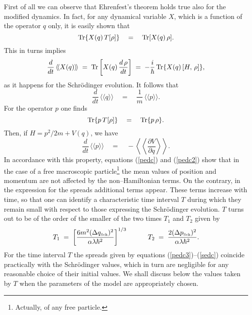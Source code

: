 \documentclass[12pt]{article}
\newcommand{\llangle}{\langle\!\langle}
\newcommand{\rrangle}{\rangle\!\rangle}
\newcommand{\LLangle}{\left\langle\!\!\!\left\langle}
\newcommand{\RRangle}{\right\rangle\!\!\!\right\rangle}
\begin{document}
First of all we can observe that Ehrenfest's theorem holds true
also for the modified dynamics. In fact, for any dynamical
variable $X$, which is a function of the operator $q$ only, it is
easily shown that
\begin{equation}
\makebox{Tr} \{ X(q)\,T[\rho]\} \quad = \quad \makebox{Tr}[X(q)\,
\rho].
\end{equation}
This in turns implies
\begin{equation}
\frac{d}{dt}\, \llangle X(q) \rrangle \; = \; \makebox{Tr} \left[
X(q)\, \frac{d\,\rho}{dt} \right] \; = \; - \frac{i}{\hbar} \,
\makebox{Tr} \{ X(q)\, [ H,\, \rho]\},
\end{equation}
as it happens for the Schr\"odinger evolution. It follows that
\begin{equation} \frac{d}{dt}\, \llangle q \rrangle \quad = \quad
\frac{1}{m}\, \llangle p \rrangle.
\end{equation}
For the operator $p$ one finds
\begin{equation}
\makebox{Tr} \{ p\, T[\rho]\} \quad = \quad \makebox{Tr} \{ p\,
\rho\}.
\end{equation}
Then, if $H = p^{2}/2m + V(q)$, we have
\begin{equation}
\frac{d}{dt}\, \llangle p \rrangle \quad = \quad - \LLangle
\frac{\partial V}{\partial q} \RRangle.
\end{equation}
In accordance with this property, equations (\ref{pedc}) and
(\ref{pedc2}) show that in the case of a free macroscopic
particle\footnote{Actually, of any free particle.} the mean values
of position and momentum are not affected by the non--Hamiltonian
terms. On the contrary, in the expression for the spreads
additional terms appear. These terms increase with time, so that
one can identify a characteristic time interval $T$ during which
they remain small with respect to those expressing the
Schr\"odinger evolution. $T$ turns out to be of the order of the
smaller of the two times $T_{1}$ and $T_{2}$ given by
\begin{equation} \label{nlhadun}
T_{1} \; = \; \left[\frac{6m^{2}(\Delta q_{\makebox{\tiny
Sch}})^{2}}{\alpha\lambda\hbar^{2}} \right]^{1/3} \qquad \quad
T_{2} \; = \; \frac{2(\Delta p_{\makebox{\tiny Sch}})^{2}}{\alpha
\lambda\hbar^{2}}.
\end{equation}
For the time interval $T$ the spreads given by equations
(\ref{pedc3})--(\ref{sedc}) coincide practically with the
Schr\"odinger values, which in turn are negligible for any
reasonable choice of their initial values. We shall discuss below
the values taken by $T$ when the parameters of the model are
appropriately chosen.
\end{document}

